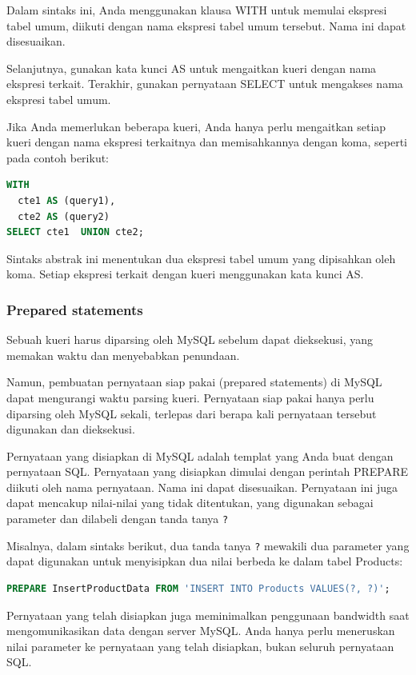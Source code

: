 \documentclass{article}
\begin{document}
Dalam sintaks ini, Anda menggunakan klausa WITH untuk memulai ekspresi tabel umum, diikuti dengan nama ekspresi tabel umum tersebut. Nama ini dapat disesuaikan.

Selanjutnya, gunakan kata kunci AS untuk mengaitkan kueri dengan nama ekspresi terkait. Terakhir, gunakan pernyataan SELECT untuk mengakses nama ekspresi tabel umum.

Jika Anda memerlukan beberapa kueri, Anda hanya perlu mengaitkan setiap kueri dengan nama ekspresi terkaitnya dan memisahkannya dengan koma, seperti pada contoh berikut:

\begin{lstlisting}[language=SQL, caption={}, captionpos=b]
WITH 
  cte1 AS (query1), 
  cte2 AS (query2) 
SELECT cte1  UNION cte2;
\end{lstlisting}

Sintaks abstrak ini menentukan dua ekspresi tabel umum yang dipisahkan oleh koma. Setiap ekspresi terkait dengan kueri menggunakan kata kunci AS.

\subsubsection{Prepared statements}
Sebuah kueri harus diparsing oleh MySQL sebelum dapat dieksekusi, yang memakan waktu dan menyebabkan penundaan.

Namun, pembuatan pernyataan siap pakai (prepared statements) di MySQL dapat mengurangi waktu parsing kueri. Pernyataan siap pakai hanya perlu diparsing oleh MySQL sekali, terlepas dari berapa kali pernyataan tersebut digunakan dan dieksekusi.

Pernyataan yang disiapkan di MySQL adalah templat yang Anda buat dengan pernyataan SQL. Pernyataan yang disiapkan dimulai dengan perintah PREPARE diikuti oleh nama pernyataan. Nama ini dapat disesuaikan. Pernyataan ini juga dapat mencakup nilai-nilai yang tidak ditentukan, yang digunakan sebagai parameter dan dilabeli dengan tanda tanya \verb|?|

Misalnya, dalam sintaks berikut, dua tanda tanya \verb|?| mewakili dua parameter yang dapat digunakan untuk menyisipkan dua nilai berbeda ke dalam tabel Products:
\begin{lstlisting}[language=SQL, caption={}, captionpos=b]
PREPARE InsertProductData FROM 'INSERT INTO Products VALUES(?, ?)'; 
\end{lstlisting}

Pernyataan yang telah disiapkan juga meminimalkan penggunaan bandwidth saat mengomunikasikan data dengan server MySQL. Anda hanya perlu meneruskan nilai parameter ke pernyataan yang telah disiapkan, bukan seluruh pernyataan SQL.
\end{document}
